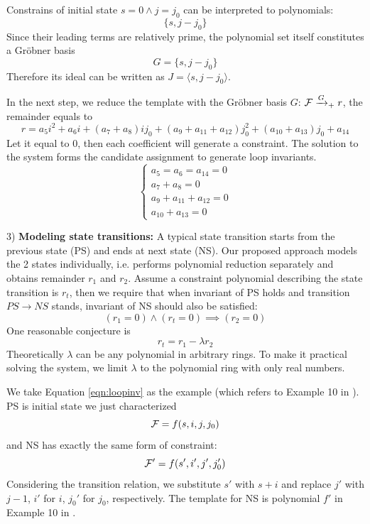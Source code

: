 Constrains of initial state $s=0\land j=j_0$ can be interpreted to polynomials:
$$\{s, j-j_0\}$$
Since their leading terms are relatively prime, the polynomial set itself constitutes a Gr\"obner basis 
$$G=\{s, j-j_0\}$$ 
Therefore its ideal can be written as
$J=\langle s,j-j_0\rangle$.

In the next step, we reduce the template with the Gr\"obner basis $G$: ${\mathcal{F}} \xrightarrow{G}_+ r$, the remainder equals to
$$r = a_5i^2+a_6i+(a_7+a_8)ij_0+(a_9+a_{11}+a_{12})j_0^2+(a_{10}+a_{13})j_0+a_{14}$$
Let it equal to 0, then each coefficient will generate a constraint. The solution to the system forms the candidate
assignment to generate loop invariants.
\begin{equation}
\left\{
\begin{array}{l}
a_5=a_6=a_{14}=0\\
a_7+a_8=0\\
a_9+a_{11}+a_{12}=0\\
a_{10}+a_{13}=0
\end{array}\right.
\nonumber
\end{equation}

3) {\bf Modeling state transitions:}
A typical state transition starts from the previous state (PS) and ends at next state (NS). 
Our proposed approach models the 2 states individually,
{i.e.} performs polynomial reduction separately and obtains remainder $r_1$ and $r_2$. 
Assume a constraint polynomial describing
the state transition is $r_t$, then we require that when invariant of PS holds and transition $PS \to NS$ stands,
invariant of NS should also be satisfied:
$$(r_1 = 0)\land (r_t = 0) \implies (r_2 = 0)$$
One reasonable conjecture is
$$r_t = r_1 - \lambda r_2$$
Theoretically $\lambda$ can be any polynomial in arbitrary rings. To make it practical solving the system, 
we limit $\lambda$ to the polynomial ring with only real numbers.

We take Equation \ref{eqn:loopinv} as the example (which refers to Example 10 in \cite{sankaranarayanan2004non}). 
PS is initial state we just characterized 
$${\mathcal{F}} = f(s,i,j,j_0)$$ 
and NS has exactly the same form of constraint:
$${\mathcal{F}}' = f(s',i',j',j_0')$$
Considering the transition relation, we substitute $s'$ with $s+i$ and replace $j'$
with $j-1$, $i'$ for $i$, $j_0'$ for $j_0$, respectively. 
The template for NS is polynomial $f'$ in Example 10 in \cite{sankaranarayanan2004non}.

